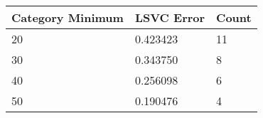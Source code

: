 \begin{tabular}{p{2cm}|p{1.7cm}|p{1.4cm}}
\toprule
 Category Minimum &    LSVC Error  &  Count \\
\midrule
               20 & 0.423423 &     11 \\
               30 & 0.343750 &      8 \\
               40 & 0.256098 &      6 \\
               50 & 0.190476 &      4 \\
\bottomrule
\end{tabular}
